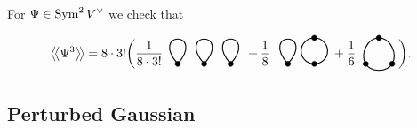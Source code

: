 \begin{example}
  For $\Psi \in \operatorname{Sym}^2 V^\vee$ we check that
  \begin{equation*}
    \bigavg{\Psi^3}
    = 8 \cdot 3! \biggl(
      \frac{1}{8 \cdot 3!} \hspace{-4mm}
      \begin{tikzpicture}[scale=2.5, baseline=2mm]
        \draw[fill=black] (0, 0) circle (.3mm);
        \draw[fill=black] (.3, 0) circle (.3mm);
        \draw[fill=black] (.6, 0) circle (.3mm);
        \draw[thick] (0, 0) to[out=50, in=130, loop] (0, 0);
        \draw[thick] (.3, 0) to[out=50, in=130, loop] (.3, 0);
        \draw[thick] (.6, 0) to[out=50, in=130, loop] (.6, 0);
      \end{tikzpicture}
      \hspace{-4mm} + \frac{1}{8} \hspace{-3mm}
      \begin{tikzpicture}[scale=2.5, baseline=2mm]
        \draw[fill=black] (0, 0) circle (.3mm);
        \draw[fill=black] (.3, 0) circle (.3mm);
        \draw[fill=black] (.3, .3) circle (.3mm);
        \draw[thick] (0, 0) to[out=50, in=130, loop] (0, 0);
        \draw[thick] (.3, .15) circle (1.5mm);
      \end{tikzpicture}
      \hspace{1mm} + \frac{1}{6} \hspace{1mm}
      \begin{tikzpicture}[scale=2.5, baseline=2mm]
        \draw[fill=black] (0, 0) circle (.3mm);
        \draw[fill=black] (.3, 0) circle (.3mm);
        \draw[fill=black] (.15, .3) circle (.3mm);
        \draw[thick] (0, 0) to[out=120, in=180] (.15, .3);
        \draw[thick] (.15, .3) to[out=0, in=60] (.3, 0);
        \draw[thick] (0, 0) to[out=-60, in=240] (.3, 0);
      \end{tikzpicture}
    \biggr).
  \end{equation*}
\end{example}

\subsection{Perturbed Gaussian}


